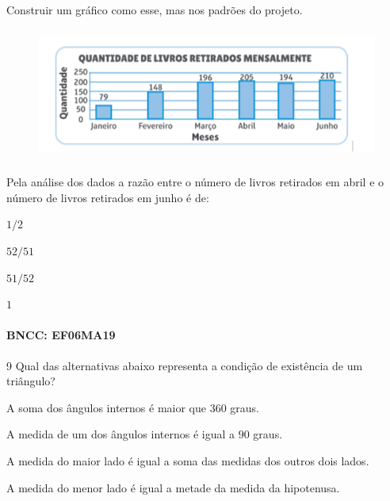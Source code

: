 {Construir um gráfico como esse, mas nos padrões do projeto.

\begin{figure}
\includegraphics[width=5in,height=1.71875in]{./imgSAEB_6_MAT/media/image117.png}
\end{figure}

Pela análise dos dados a razão entre o número de livros retirados em
abril e o número de livros retirados em junho é de:

\begin{escolha}
\item $1/2$
\item $52/51$
\item $51/52$
\item $1$
\end{escolha}

\paragraph{BNCC: EF06MA19}


\num{9}  Qual das alternativas abaixo representa a condição de existência de
um triângulo?

\begin{escolha}
\item A soma dos ângulos internos é maior que $360$ graus. 
\item A medida de um
dos ângulos internos é igual a $90$ graus. 
\item A medida do maior lado é
igual a soma das medidas dos outros dois lados. 
\item A medida do menor
lado é igual a metade da medida da hipotenusa.
\end{escolha}

}
